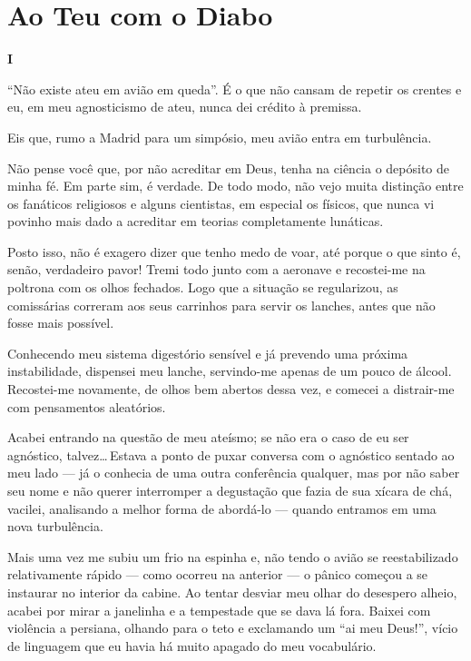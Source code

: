 \chapter{Ao Teu com o Diabo}


\begin{center}
{\Large \textbf{I}}
\end{center}

``Não existe ateu em avião em queda''. É o que não cansam de repetir os crentes e eu, em meu agnosticismo de ateu, nunca dei crédito à premissa.

Eis que, rumo a Madrid para um simpósio, meu avião entra em turbulência.

Não pense você que, por não acreditar em Deus, tenha na ciência o depósito de minha fé. Em parte sim, é verdade. De todo modo, não vejo muita distinção entre os fanáticos religiosos e alguns cientistas, em especial os físicos, que nunca vi povinho mais dado a acreditar em teorias completamente lunáticas.

Posto isso, não é exagero dizer que tenho medo de voar, até porque o que sinto é, senão, verdadeiro pavor! Tremi todo junto com a aeronave e recostei-me na poltrona com os olhos fechados. Logo que a situação se regularizou, as comissárias correram aos seus carrinhos para servir os lanches, antes que não fosse mais possível.

\begin{sloppypar}
Conhecendo meu sistema digestório sensível e já prevendo uma próxima instabilidade, dispensei meu lanche, servindo-me apenas de um pouco de álcool. Recostei-me novamente, de olhos bem abertos dessa vez, e comecei a distrair-me com pensamentos aleatórios.
\end{sloppypar}

Acabei entrando na questão de meu ateísmo; se não era o caso de eu ser agnóstico, talvez\ldots\,Estava a ponto de puxar conversa com o agnóstico sentado ao meu lado --- já o conhecia de uma outra conferência qualquer, mas por não saber seu nome e não querer interromper a degustação que fazia de sua xícara de chá, vacilei, analisando a melhor forma de abordá-lo --- quando entramos em uma nova turbulência.

Mais uma vez me subiu um frio na espinha e, não tendo o avião se reestabilizado relativamente rápido --- como ocorreu na anterior --- o pânico começou a se instaurar no interior da cabine. Ao tentar desviar meu olhar do desespero alheio, acabei por mirar a janelinha e a tempestade que se dava lá fora. Baixei com violência a persiana, olhando para o teto e exclamando um ``ai meu Deus!'', vício de linguagem que eu havia há muito apagado do meu vocabulário.

